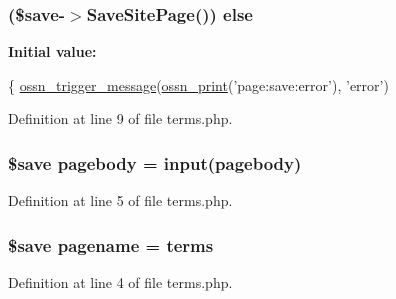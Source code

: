 \subsubsection[{\texorpdfstring{else}{else}}]{ (\$save-\/$>$Save\+Site\+Page()) else}\hypertarget{actions_2edit_2terms_8php_a3652d10f06e3bfc8edd1455fd0c357ae}{}\label{actions_2edit_2terms_8php_a3652d10f06e3bfc8edd1455fd0c357ae}
{\bfseries Initial value\+:}
\begin{DoxyCode}
\{
    \hyperlink{ossn_8lib_8system_8php_ab3f23f23f32f50c12e7aea0ffaccaac7}{ossn\_trigger\_message}(\hyperlink{ossn_8lib_8languages_8php_a2be5d1c4b695593a9b9067b96df2150a}{ossn\_print}(\textcolor{stringliteral}{'page:save:error'}), \textcolor{stringliteral}{'error'})
\end{DoxyCode}


Definition at line 9 of file terms.\+php.

\subsubsection[{\texorpdfstring{pagebody}{pagebody}}]{\setlength{\rightskip}{0pt plus 5cm}\$save pagebody = {\bf input}(\textquotesingle{}pagebody\textquotesingle{})}\hypertarget{actions_2edit_2terms_8php_ac5e77655d4436fc87c23b803e772f55b}{}\label{actions_2edit_2terms_8php_ac5e77655d4436fc87c23b803e772f55b}


Definition at line 5 of file terms.\+php.

\subsubsection[{\texorpdfstring{pagename}{pagename}}]{\setlength{\rightskip}{0pt plus 5cm}\$save pagename = \textquotesingle{}terms\textquotesingle{}}\hypertarget{actions_2edit_2terms_8php_a80628cda62ee6fb56006a1a49ea33304}{}\label{actions_2edit_2terms_8php_a80628cda62ee6fb56006a1a49ea33304}


Definition at line 4 of file terms.\+php.


